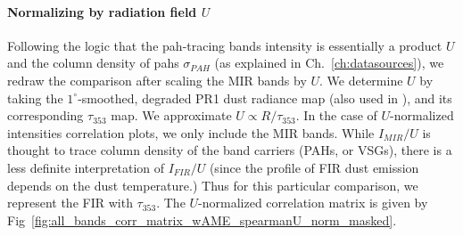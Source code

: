         \paragraph{Normalizing by radiation field $U$}
          Following the logic that the \acrshort{pah}-tracing bands intensity is essentially a product $U$ and the column density of \acrshort{pah}s $\sigma_{PAH}$ (as explained in Ch.~\ref{ch:datasources}), we redraw the comparison after scaling the MIR bands by $U$. We determine $U$ by taking the $1^{\circ}$-smoothed, degraded PR1 dust radiance map (also used in \citep{hensley16}), and its corresponding $\tau_{353}$ map. We approximate $U \propto R/\tau_{353}$. In the case of $U$-normalized intensities correlation plots, we only include the MIR bands. While $I_{MIR}/U$ is thought to trace column density of the band carriers (PAHs, or VSGs), there is a less definite interpretation of $I_{FIR}/U$ (since the profile of FIR dust emission depends on the dust temperature.) Thus for this particular comparison, we represent the FIR with $\tau_{353}$. The $U$-normalized correlation matrix is given by Fig~\ref{fig:all_bands_corr_matrix_wAME_spearmanU_norm_masked}.
